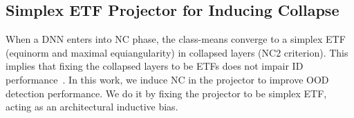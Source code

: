 
\subsection{Simplex ETF Projector for Inducing Collapse}
\label{sec:etf_projector_nc}



When a DNN enters into NC phase, the class-means converge to a simplex ETF (equinorm and
maximal equiangularity) in collapsed layers (NC2 criterion). This implies that fixing the collapsed layers to be ETFs does not impair ID performance~\cite{rangamani2023feature, zhu2021geometric}.
In this work, we induce NC in the projector to improve OOD detection performance. 
We do it by fixing the projector to be simplex ETF, acting as an architectural inductive bias.

